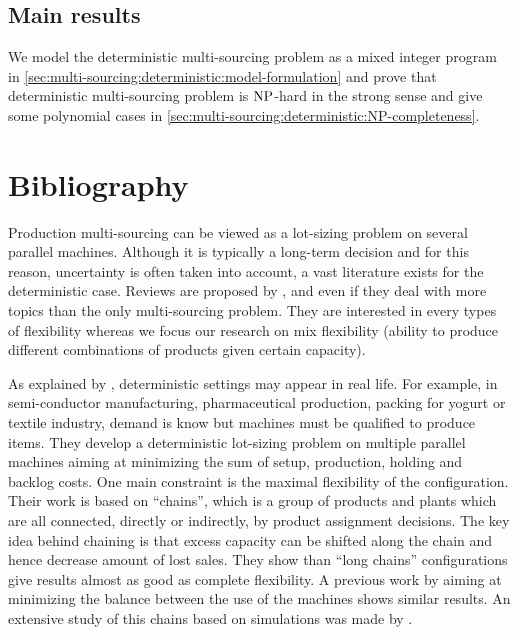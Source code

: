 \subsection{Main results}
\label{sec:multi-sourcing:deterministic:introduction:main_results}


We model the deterministic multi-sourcing problem as a mixed integer program in \cref{sec:multi-sourcing:deterministic:model-formulation} and prove that deterministic multi-sourcing problem is $\operatorname{NP}$-hard in the strong sense and give some polynomial cases in \cref{sec:multi-sourcing:deterministic:NP-completeness}.


\section{Bibliography}


Production multi-sourcing can be viewed as a lot-sizing problem on several parallel machines.
Although it is typically a long-term decision and for this reason, uncertainty is often taken into account, a vast literature exists for the deterministic case.
Reviews are proposed by \citet{Sethi1990}, \citet{Koste1999} and \citet{Stevenson2007} even if they deal with more topics than the only multi-sourcing problem.
They are interested in every types of flexibility whereas we focus our research on mix flexibility (ability to produce different combinations of products given certain capacity).


As explained by \citet{Fiorotto2018}, deterministic settings may appear in real life.
For example, in semi-conductor manufacturing, pharmaceutical production, packing for yogurt or textile industry, demand is know but machines must be qualified to produce items.
They develop a deterministic lot-sizing problem on multiple parallel machines aiming at minimizing the sum of setup, production, holding and backlog costs.
One main constraint is the maximal flexibility of the configuration.
Their work is based on ``chains'', which is a group of products and plants which are all connected, directly or indirectly, by product assignment decisions.
The key idea behind chaining is that excess capacity can be shifted along the chain and hence decrease amount of lost sales. 
They show than ``long chains'' configurations give results almost as good as complete flexibility.
A previous work by \citet{Ignizio2009} aiming at minimizing the balance between the use of the machines shows similar results.
An extensive study of this chains based on simulations was made by \citet{Muriel2006}.


